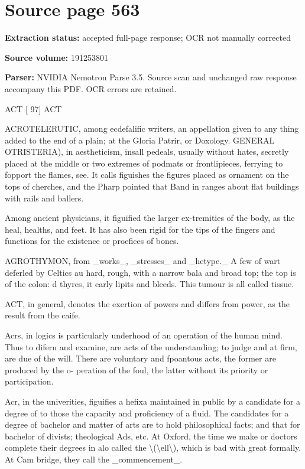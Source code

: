 \clearpage
\section{Source page 563}
\textbf{Extraction status:} accepted full-page response; OCR not manually corrected\par
\textbf{Source volume:} 191253801\par
\textbf{Parser:} NVIDIA Nemotron Parse 3.5. Source scan and unchanged raw response accompany this PDF. OCR errors are retained.\par\medskip
ACT [ 97] ACT\par\medskip
ACROTELERUTIC, among ecdefalific writers, an appellation given to any thing added to the end of a plain; at the Gloria Patrir, or Doxology. GENERAL OTRISTERIA), in aestheticism, insall pedeals, usually without hates, secretly placed at the middle or two extremes of podmats or frontlipieces, ferrying to fopport the flames, see. It calls figuishes the figures placed as ornament on the tops of cherches, and the Pharp pointed that Band in ranges about flat buildings with rails and ballers.\par\medskip
Among ancient physicians, it figuified the larger ex-tremities of the body, as the heal, healths, and feet. It has also been rigid for the tips of the fingers and functions for the existence or proefices of bones.\par\medskip
AGROTHYMON, from \_works\_, \_stresses\_ and \_hetype.\_ A few of wart deferled by Celtics au hard, rough, with a narrow bala and broad top; the top is of the colon: d thyres, it early lipits and bleeds. This tumour is all called tissue.\par\medskip
ACT, in general, denotes the exertion of powers and differs from power, as the result from the caife.\par\medskip
Acrs, in logics is particularly underhood of an operation of the human mind. Thus to difern and examine, are acts of the understanding; to judge and at firm, are due of the will. There are voluntary and fpoantous acts, the former are produced by the o- peration of the foul, the latter without its priority or participation.\par\medskip
Acr, in the univerities, figuifies a hefixa maintained in public by a candidate for a degree of to those the capacity and proficiency of a fluid. The candidates for a degree of bachelor and matter of arts are to hold philosophical facts; and that for bachelor of divists; theological Ads, etc. At Oxford, the time we make or doctors complete their degrees in alo called the \textbackslash{}(\textbackslash{}ell\textbackslash{}), which is bad with great formally. At Cam bridge, they call the \_commencement\_.\par\medskip

